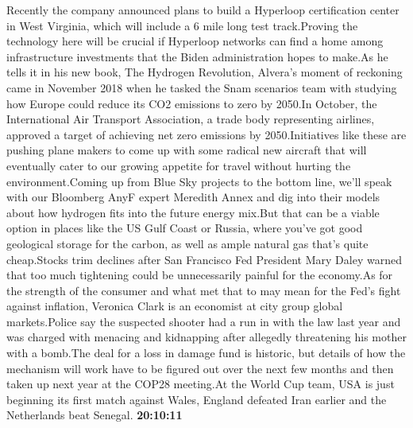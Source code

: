 \documentclass{article}%
\begin{document}
Recently the company announced plans to build a Hyperloop certification center in West Virginia, which will include a 6 mile long test track.Proving the technology here will be crucial if Hyperloop networks can find a home among infrastructure investments that the Biden administration hopes to make.As he tells it in his new book, The Hydrogen Revolution, Alvera's moment of reckoning came in November 2018 when he tasked the Snam scenarios team with studying how Europe could reduce its CO2 emissions to zero by 2050.In October, the International Air Transport Association, a trade body representing airlines, approved a target of achieving net zero emissions by 2050.Initiatives like these are pushing plane makers to come up with some radical new aircraft that will eventually cater to our growing appetite for travel without hurting the environment.Coming up from Blue Sky projects to the bottom line, we'll speak with our Bloomberg AnyF expert Meredith Annex and dig into their models about how hydrogen fits into the future energy mix.But that can be a viable option in places like the US Gulf Coast or Russia, where you've got good geological storage for the carbon, as well as ample natural gas that's quite cheap.Stocks trim declines after San Francisco Fed President Mary Daley warned that too much tightening could be unnecessarily painful for the economy.As for the strength of the consumer and what met that to may mean for the Fed's fight against inflation, Veronica Clark is an economist at city group global markets.Police say the suspected shooter had a run in with the law last year and was charged with menacing and kidnapping after allegedly threatening his mother with a bomb.The deal for a loss in damage fund is historic, but details of how the mechanism will work have to be figured out over the next few months and then taken up next year at the COP28 meeting.At the World Cup team, USA is just beginning its first match against Wales, England defeated Iran earlier and the Netherlands beat Senegal.%
\textbf{20:10:11}%
\newline%
\end{document}
